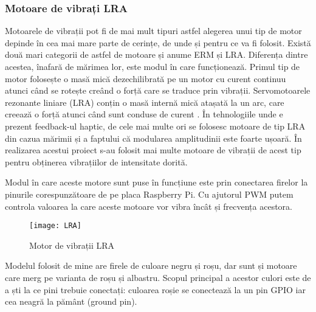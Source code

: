 \documentclass[../IoMusT.tex]{subfiles}
\begin{document}
\subsubsection{Motoare de vibrați LRA}
Motoarele de vibrații pot fi de mai mult tipuri astfel alegerea unui tip de motor depinde în cea mai mare parte de cerințe, de unde și pentru ce va fi folosit. Există două mari categorii de astfel de motoare și anume ERM și LRA. Diferența dintre acestea, înafară de mărimea lor, este modul în care funcționează. Primul tip de motor folosește o masă mică dezechilibrată pe un motor cu curent continuu atunci când se rotește creând o forță care se traduce prin vibrații. Servomotoarele rezonante liniare (LRA) conțin o masă internă mică atașată la un arc, care creează o forță atunci când sunt conduse de curent \cite{LRA}. În tehnologiile unde e prezent feedback-ul haptic, de cele mai multe ori se folosesc motoare de tip LRA din cazua mărimii și a faptului că modularea amplitudinii este foarte ușoară. În realizarea acestui proiect s-au folosit mai multe motoare de vibrații de acest tip pentru obținerea vibrațiilor de intensitate dorită.
\\
\par Modul în care aceste motore sunt puse în funcțiune este prin conectarea firelor la pinurile corespunzătoare de pe placa Raspberry Pi. Cu ajutorul PWM putem controla valoarea la care aceste motoare vor vibra încât și frecvența acestora.
\begin{figure}[h]
\centering
\texttt{[image: LRA]}
\caption{Motor de vibrații LRA}
\end{figure}
Modelul folosit de mine are firele de culoare negru și roșu, dar sunt și motoare care merg pe varianta de roșu și albastru. Scopul principal a acestor culori este de a ști la ce pini trebuie conectați: culoarea roșie se conectează la un pin GPIO iar cea neagră la pământ (ground pin).
\end{document}
